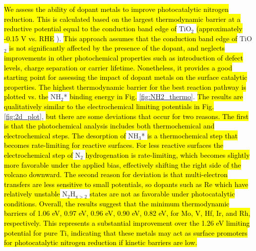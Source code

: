 
\hl{We assess the ability of dopant metals to improve photocatalytic nitrogen reduction. This is calculated based on the largest thermodynamic barrier at a reductive potential equal to the conduction band edge of }TiO$_2$\hl{ (approximately -0.15 V vs. RHE} \cite{Nozik_1996}).\hl{ This approach assumes that the conduction band edge of} TiO$_2$ \hl{is not significantly affected by the presence of the dopant, and neglects improvements in other photochemical properties such as introduction of defect levels, charge separation or carrier lifetime. Nonetheless, it provides a good starting point for assessing the impact of dopant metals on the surface catalytic properties. 
The highest thermodynamic barrier for the best reaction pathway is plotted vs. the }NH$_2$* \hl{binding energy in Fig.} \ref{fig:NH2_thermo}. \hl{The results are qualitatively similar to the electrochemical limiting potentials in Fig.} \ref{fig:2d_plot}, \hl{but there are some deviations that occur for two reasons. The first is that the photochemical analysis includes both thermochemical and electrochemical steps. The desorption of} NH$_3$* \hl{is a thermochemical step that becomes rate-limiting for reactive surfaces. For less reactive surfaces the electrochemical step of }N$_2$ \hl{hydrogenation is rate-limiting, which becomes slightly more favorable under the applied bias, effectively shifting the right side of the volcano downward. The second reason for deviation is that multi-electron transfers are less sensitive to small potentials, so dopants such as Re which have relatively unstable} N$_2$H$_{\mathrm{x}>2}$ \hl{states are not as favorable under photocatalytic conditions. Overall, the results suggest that the minimum thermodynamic barriers of 1.06 eV, 0.97 eV, 0.96 eV, 0.90 eV, 0.82 eV, for Mo, V, Hf, Ir, and  Rh, respectively. This represents a substantial improvement over the 1.26 eV limiting potential for pure Ti, indicating that these metals may act as surface promoters for photocatalytic nitrogen reduction if kinetic barriers are low.}

